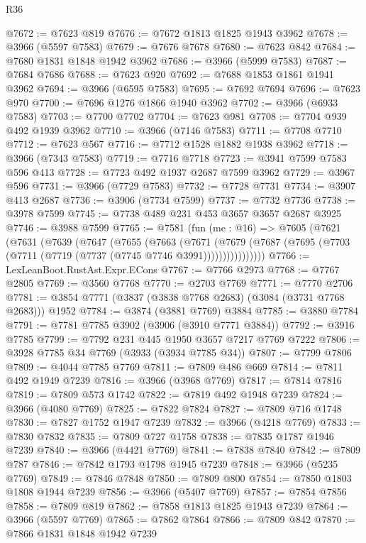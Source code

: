\begin{lexlean}{R36}
\begin{coremodule}
@7672 := @7623 @819
@7676 := @7672 @1813 @1825 @1943 @3962
@7678 := @3966 (@5597 @7583)
@7679 := @7676 @7678
@7680 := @7623 @842
@7684 := @7680 @1831 @1848 @1942 @3962
@7686 := @3966 (@5999 @7583)
@7687 := @7684 @7686
@7688 := @7623 @920
@7692 := @7688 @1853 @1861 @1941 @3962
@7694 := @3966 (@6595 @7583)
@7695 := @7692 @7694
@7696 := @7623 @970
@7700 := @7696 @1276 @1866 @1940 @3962
@7702 := @3966 (@6933 @7583)
@7703 := @7700 @7702
@7704 := @7623 @981
@7708 := @7704 @939 @492 @1939 @3962
@7710 := @3966 (@7146 @7583)
@7711 := @7708 @7710
@7712 := @7623 @567
@7716 := @7712 @1528 @1882 @1938 @3962
@7718 := @3966 (@7343 @7583)
@7719 := @7716 @7718
@7723 := @3941 @7599 @7583 @596 @413
@7728 := @7723 @492 @1937 @2687 @7599 @3962
@7729 := @3967 @596
@7731 := @3966 (@7729 @7583)
@7732 := @7728 @7731
@7734 := @3907 @413 @2687
@7736 := @3906 (@7734 @7599)
@7737 := @7732 @7736
@7738 := @3978 @7599
@7745 := @7738 @489 @231 @453 @3657 @3657 @2687 @3925
@7746 := @3988 @7599
@7765 := @7581
    (fun (me : @16) =>
    @7605
      (@7621
        (@7631
          (@7639
            (@7647
              (@7655
                (@7663
                  (@7671
                    (@7679
                      (@7687 (@7695 (@7703 (@7711 (@7719 (@7737 (@7745 @7746 @3991))))))))))))))))
@7766 := LexLeanBoot.RustAst.Expr.ECons
@7767 := @7766 @2973
@7768 := @7767 @2805
@7769 := @3560 @7768
@7770 := @2703 @7769
@7771 := @7770 @2706
@7781 := @3854 @7771 (@3837 (@3838 @7768 @2683) (@3084 (@3731 @7768 @2683))) @1952
@7784 := @3874 (@3881 @7769) @3884
@7785 := @3880 @7784
@7791 := @7781 @7785 @3902 (@3906 (@3910 @7771 @3884))
@7792 := @3916 @7785
@7799 := @7792 @231 @445 @1950 @3657 @7217 @7769 @7222
@7806 := @3928 @7785 @34 @7769 (@3933 (@3934 @7785 @34))
@7807 := @7799 @7806
@7809 := @4044 @7785 @7769
@7811 := @7809 @486 @669
@7814 := @7811 @492 @1949 @7239
@7816 := @3966 (@3968 @7769)
@7817 := @7814 @7816
@7819 := @7809 @573 @1742
@7822 := @7819 @492 @1948 @7239
@7824 := @3966 (@4080 @7769)
@7825 := @7822 @7824
@7827 := @7809 @716 @1748
@7830 := @7827 @1752 @1947 @7239
@7832 := @3966 (@4218 @7769)
@7833 := @7830 @7832
@7835 := @7809 @727 @1758
@7838 := @7835 @1787 @1946 @7239
@7840 := @3966 (@4421 @7769)
@7841 := @7838 @7840
@7842 := @7809 @787
@7846 := @7842 @1793 @1798 @1945 @7239
@7848 := @3966 (@5235 @7769)
@7849 := @7846 @7848
@7850 := @7809 @800
@7854 := @7850 @1803 @1808 @1944 @7239
@7856 := @3966 (@5407 @7769)
@7857 := @7854 @7856
@7858 := @7809 @819
@7862 := @7858 @1813 @1825 @1943 @7239
@7864 := @3966 (@5597 @7769)
@7865 := @7862 @7864
@7866 := @7809 @842
@7870 := @7866 @1831 @1848 @1942 @7239

\end{coremodule}
\end{lexlean}
